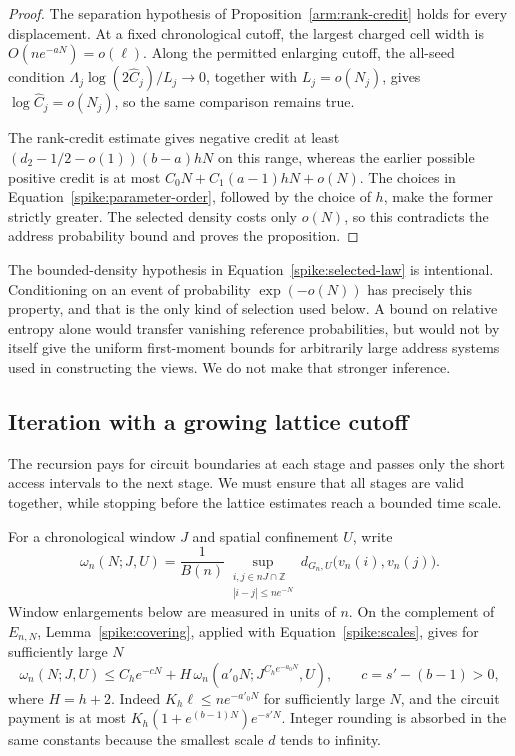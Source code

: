 \begin{proof}
The separation hypothesis of Proposition~\ref{arm:rank-credit}
holds for every displacement.  At a fixed chronological cutoff, the
largest charged cell width is $O(ne^{-aN})=o(\ell)$.  Along the
permitted enlarging cutoff, the all-seed condition
$\Lambda_j\log(2\widehat C_j)/L_j\to0$, together with $L_j=o(N_j)$,
gives $\log\widehat C_j=o(N_j)$, so the same comparison remains true.

The rank-credit estimate gives negative credit at least
$(d_2-1/2-o(1))(b-a)hN$ on this range, whereas the earlier possible
positive credit is at most $C_0N+C_1(a-1)hN+o(N)$.  The choices in
Equation~\eqref{spike:parameter-order}, followed by the choice of $h$,
make the former strictly greater.  The selected density costs only
$o(N)$, so this contradicts the address probability bound and proves
the proposition.
\end{proof}

\begin{remark}\label{spike:selection-strength}
The bounded-density hypothesis in Equation~\eqref{spike:selected-law}
is intentional.  Conditioning on an event of probability
$\exp(-o(N))$ has precisely this property, and that is the only kind of
selection used below.  A bound on relative entropy alone would transfer
vanishing reference probabilities, but would not by itself give the
uniform first-moment bounds for arbitrarily large address systems used
in constructing the views.  We do not make that stronger inference.
\end{remark}

\subsection{Iteration with a growing lattice cutoff}

The recursion pays for circuit boundaries at each stage and passes only
the short access intervals to the next stage.  We must ensure that all
stages are valid together, while stopping before the lattice estimates
reach a bounded time scale.

For a chronological window $J$ and spatial confinement $U$, write
\[
 \omega_n(N;J,U)=\frac1{B(n)}
 \sup_{\substack{i,j\in nJ\cap\mathbb Z\\ |i-j|\le n e^{-N}}}
 d_{G_n,U}\bigl(v_n(i),v_n(j)\bigr).
\]
Window enlargements below are measured in units of $n$.  On the
complement of $E_{n,N}$, Lemma~\ref{spike:covering}, applied with
Equation~\eqref{spike:scales}, gives for sufficiently large $N$
\begin{equation}\label{spike:omega-recursion}
 \omega_n(N;J,U)
 \le C_h e^{-cN}+H\,
 \omega_n(a'_0N;J^{C_h e^{-a_0N}},U),
 \qquad c=s'-(b-1)>0,
\end{equation}
where $H=h+2$.  Indeed
$K_h\ell\le n e^{-a'_0N}$ for sufficiently large $N$, and the circuit
payment is at most
$K_h(1+e^{(b-1)N})e^{-s'N}$.  Integer rounding is absorbed in the same
constants because the smallest scale $d$ tends to infinity.

